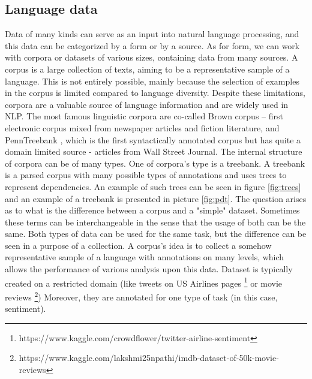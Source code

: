 \subsection{Language data}
Data of many kinds can serve as an input into natural language processing, and this data can be categorized by a form or by a source.
As for form, we can work with corpora or datasets of various sizes, containing data from many sources. A corpus is a large collection of texts, aiming to be a representative sample of a language. This is not entirely possible, mainly because the selection of examples in the corpus is limited compared to language diversity. Despite these limitations, corpora are a valuable source of language information and are widely used in NLP. The most famous linguistic corpora are co-called Brown corpus \citep{francis79browncorpus} -- first electronic corpus mixed from newspaper articles and fiction literature, and PennTreebank \citep{Marcus1993}, which is the first syntactically annotated corpus but has quite a domain limited source - articles from Wall Street Journal. The internal structure of corpora can be of many types. One of corpora's type is a treebank. A treebank is a parsed corpus with many possible types of annotations and uses trees to represent dependencies. An example of such trees can be seen in figure \ref{fig:trees} and an example of a treebank is presented in picture \ref{fig:pdt}.
The question arises as to what is the difference between a corpus and a "simple" dataset. Sometimes these terms can be interchangeable in the sense that the usage of both can be the same. Both types of data can be used for the same task, but the difference can be seen in a purpose of a collection. A corpus's idea is to collect a somehow representative sample of a language with annotations on many levels, which allows the performance of various analysis upon this data. Dataset is typically created on a restricted domain (like tweets on US Airlines pages \footnote{https://www.kaggle.com/crowdflower/twitter-airline-sentiment} or movie reviews \footnote{https://www.kaggle.com/lakshmi25npathi/imdb-dataset-of-50k-movie-reviews}) 
Moreover, they are annotated for one type of task (in this case, sentiment).  
